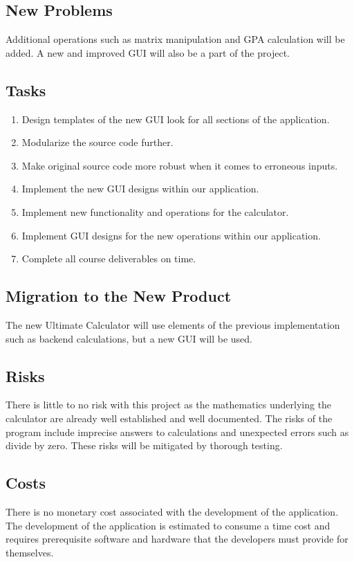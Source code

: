 \documentclass[12pt, titlepage]{article}
\begin{document}
\subsection{New Problems}
Additional operations such as matrix manipulation and GPA calculation will be added. A new and improved GUI will also be a part of the project.
\subsection{Tasks}
\begin{enumerate}
    \item Design templates of the new GUI look for all sections of the application.
    \item Modularize the source code further.
    \item Make original source code more robust when it comes to erroneous inputs.
    \item Implement the new GUI designs within our application.
    \item Implement new functionality and operations for the calculator.
    \item Implement GUI designs for the new operations within our application.
    \item Complete all course deliverables on time.
\end{enumerate}
\subsection{Migration to the New Product}
The new Ultimate Calculator will use elements of the previous implementation such as backend calculations, but a new GUI will be used.
\subsection{Risks}
There is little to no risk with this project as the mathematics underlying the calculator are already well established and well documented. The risks of the program include imprecise answers to calculations and unexpected errors such as divide by zero. These risks will be mitigated by thorough testing.
\subsection{Costs}
There is no monetary cost associated with the development of the application. The development of the application is estimated to consume a time cost and requires prerequisite software and hardware that the developers must provide for themselves.
\end{document}
